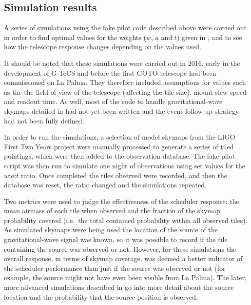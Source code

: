 \subsection{Simulation results}
\label{sec:scheduler_sim_results}
\begin{colsection}

A series of simulations using the fake pilot code described above were carried out in order to find optimal values for the weights ($w$, $a$ and $t$) given in , and to see how the telescope response changes depending on the values used.

It should be noted that these simulations were carried out in 2016, early in the development of G-TeCS and before the first GOTO telescope had been commissioned on La Palma. They therefore included assumptions for values such as the the field of view of the telescope (affecting the tile size), mount slew speed and readout time. As well, most of the code to handle gravitational-wave skymaps detailed in  had not yet been written and the event follow-up strategy had not been fully defined.

In order to run the simulations, a selection of model skymaps from the LIGO First Two Years project \citep{First2Years} were manually processed to generate a series of tiled pointings, which were then added to the observation database. The fake pilot script was then run to simulate one night of observations using set values for the $w$:$a$:$t$ ratio. Once completed the tiles observed were recorded, and then the database was reset, the ratio changed and the simulations repeated.

Two metrics were used to judge the effectiveness of the scheduler response: the mean airmass of each tile when observed and the fraction of the skymap probability covered (i.e.\ the total contained probability within all observed tiles). As simulated skymaps were being used the location of the source of the gravitational-wave signal was known, so it was possible to record if the tile containing the source was observed or not. However, for these simulations the overall response, in terms of skymap coverage, was deemed a better indicator of the scheduler performance than just if the source was observed or not (for example, the source might not have even been visible from La Palma). The later, more advanced simulations described in  go into more detail about the source location and the probability that the source position is observed.

\newpage

\end{colsection}

